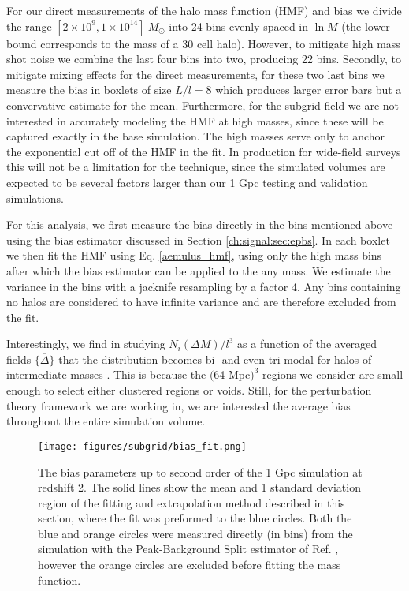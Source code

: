 For our direct measurements of the halo mass function (HMF) and bias we divide the range $[2\times 10^9, 1\times 10^{14}]~M_\odot$ into 24 bins evenly spaced in $\ln{M}$ (the lower bound corresponds to the mass of a 30 cell halo). However, to mitigate high mass shot noise we combine the last four bins into two, producing 22 bins. Secondly, to mitigate mixing effects for the direct measurements, for these two last bins we measure the bias in boxlets of size $L/l = 8$ which produces larger error bars but a convervative estimate for the mean. Furthermore, for the subgrid field we are not interested in accurately modeling the HMF at high masses, since these will be captured exactly in the base simulation. The high masses serve only to anchor the exponential cut off of the HMF in the fit. In production for wide-field surveys this will not be a limitation for the technique, since the simulated volumes are expected to be several factors larger than our 1 Gpc testing and validation simulations.

For this analysis, we first measure the bias directly in the bins mentioned above using the bias estimator discussed in Section \ref{ch:signal:sec:epbs}. In each boxlet we then fit the HMF using Eq. \ref{aemulus_hmf}, using only the high mass bins after which the bias estimator can be applied to the any mass. We estimate the variance in the bins with a jacknife resampling by a factor 4. Any bins containing no halos are considered to have infinite variance and are therefore excluded from the fit.

Interestingly, we find in studying  $N_i(\Delta M)/l^3$ as a function of the averaged fields $\{\overline{\Delta}\}$ that the distribution becomes bi- and even tri-modal for halos of intermediate masses \citep{BAM}. This is because the $($64 Mpc$)^3$ regions we consider are small enough to select either clustered regions or voids. Still, for the perturbation theory framework we are working in, we are interested the average bias throughout the entire simulation volume.

\begin{figure} %
\begin{center}
\texttt{[image: figures/subgrid/bias\_fit.png]}%
\caption{The bias parameters up to second order of the 1 Gpc simulation at redshift 2. The solid lines show the mean and 1 standard deviation region of the fitting and extrapolation method described in this section, where the fit was preformed to the blue circles. Both the blue and orange circles were measured directly (in bins) from the simulation with the Peak-Background Split estimator of Ref. \citep{modietal2017}, however the orange circles are excluded before fitting the mass function.}
\label{bias_fit}
\end{center}
\end{figure}


